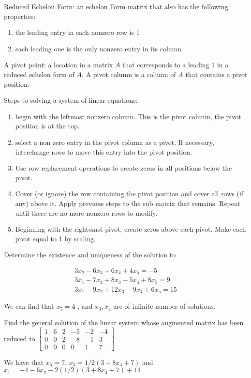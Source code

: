 \documentclass[../linalg.tex]{subfiles}
\begin{document}
Reduced Echelon Form: an echelon Form matrix that also has the following properties:
\begin{enumerate}
    \item the leading entry in each nonzero row is 1 
    \item each leading one is the only nonzero entry in its column
\end{enumerate}

A pivot point: a location in a matrix $A$ that corresponds to a leading 1 in a reduced echelon form of $A$. A pivot column is a column of $A$ that contains a pivot position.

Steps to solving a system of linear equations:
\begin{enumerate}
    \item begin with the leftmost nonzero column. This is the pivot column, the pivot position is at the top.
    \item select a non zero entry in the pivot column as a pivot. If necessary, interchange rows to move this entry into the pivot position.
    \item Use row replacement operations to create zeros in all positions below the pivot.
    \item Cover (or ignore) the row containing the pivot position and cover all rows (if any) above it. Apply previous steps to the sub matrix that remains. Repeat until there are no more nonzero rows to modify.
    \item Beginning with the rightomst pivot, create zeros above each pivot. Make each pivot equal to 1 by scaling.
\end{enumerate}

\begin{example}
    Determine the existence and uniqueness of the solution to 

    \begin{align*}
    3x_2-6x_3+6x_4+4x_5=-5\\ 
    3x_1-7x_2+8x_3-5x_4+8x_5 = 9\\
    3x_1-9x_2+12x_3-9x_4+6x_5=15
    \end{align*}

    We can find that $x_5=4$ , and $x_3,x_4$ are of infinite number of solutions. 
\end{example}

\begin{example}
    Find the general solution of the linear system whose augmented matrix has been reduced to 
    $\begin{bmatrix}
        1 & 6 & 2 & -5 & -2 & -4 \\
        0 & 0 & 2 & -8 & -1 & 3 \\
        0 & 0 & 0 & 0& 1 & 7
    \end{bmatrix}$

    We have that $x_5=7$, $x_3=1/2(3+8x_4+7)$ and $x_1=-4-6x_2-2(1/2)(3+8x_4+7)+14$
\end{example}
\end{document}
